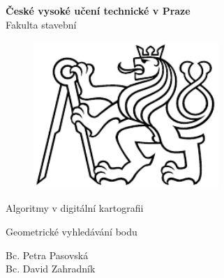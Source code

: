 \documentclass[a4paper, 12pt]{article}
\begin{document}
\begin{titlepage}
\begin{center}
\noindent
\Large \textbf{České vysoké učení technické v Praze }\\ Fakulta stavební
\vspace{5cm}

\huge

\begin{figure}[h!]
	\centering
	\includegraphics[width=7cm]{logo.png}
\end{figure}

\vspace{0.5cm}

Algoritmy v digitální kartografii \\

\vspace{3cm}

\Huge  
Geometrické vyhledávání bodu\\

\vspace{2cm}

\Large
Bc. Petra Pasovská \\
Bc. David Zahradník \\

\end{center}

\end{titlepage}




\pagestyle{plain}     %
\setcounter{page}{1}  %

\tableofcontents
\newpage
\end{document}
